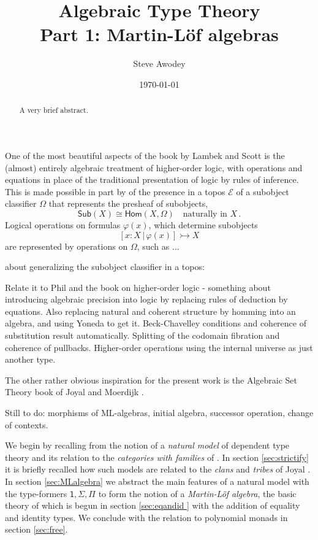 \documentclass[12pt,reqno]{amsart}
\newcommand{\EE}{\ensuremath{\mathcal{E}}}
\newcommand{\Hom}{\ensuremath{\mathsf{Hom}}}
\newcommand{\mono}{\ensuremath{\rightarrowtail}}
\theoremstyle{remark}
\theoremstyle{definition}
\begin{document}

\title{Algebraic Type Theory\\
Part 1: Martin-L\"of algebras}
\author{Steve Awodey}
\date{\today}

\begin{abstract}
A very brief abstract.
\end{abstract}
\maketitle

One of the most beautiful aspects of the book \cite{LS} by Lambek and Scott is the (almost) entirely algebraic treatment of higher-order logic, with operations and equations in place of the traditional presentation of logic by rules of inference.   This is made possible in part by of the presence in a topos $\EE$ of a subobject classifier $\Omega$ that represents the presheaf of subobjects,
\[
\mathsf{Sub}(X) \cong \Hom(X, \Omega) \quad\text{naturally in $X$}\,.
\]
Logical operations on formulas $\varphi(x)$, which determine subobjects $$[x:X\, |\, \varphi(x)] \mono X$$ are represented by operations on $\Omega$, such as ...

 about generalizing the subobject classifier in a topos: 

Relate it to Phil and the book on higher-order logic - something about introducing algebraic precision into logic by replacing rules of deduction by equations. Also replacing natural and coherent structure by homming into an algebra, and using Yoneda to get it.  Beck-Chavelley conditions and coherence of substitution result automatically.  Splitting of the codomain fibration and coherence of pullbacks.  Higher-order operations using the internal universe as just another type. 

The other rather obvious inspiration for the present work is the Algebraic Set Theory book of Joyal and Moerdijk \cite{}. 

Still to do: morphisms of ML-algebras, initial algebra, successor operation, change of contexts.

We begin by recalling from \cite{awodey:NM} the notion of a \emph{natural model} of dependent type theory and its relation to the \emph{categories with families} of \cite{Dybjer:CWF}.  In section \ref{sec:strictify} it is briefly recalled how such models are related to the \emph{clans} and \emph{tribes} of Joyal \cite{Joyal:CandT}.  In section \ref{sec:MLalgebra} we abstract the main features of a natural model with the type-formers $\mathsf{1}, \Sigma, \Pi$ to form the notion of a \emph{Martin-L\"of algebra}, the basic theory of which is begun in section \ref{sec:eqandid } with the addition of equality and identity types.  We conclude with the relation to polynomial monads in section \ref{sec:free}. 
\end{document}
